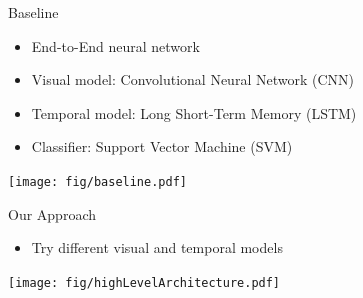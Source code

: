 \documentclass{beamer}
\begin{document}
\begin{frame}{Baseline}
    \begin{itemize}
        \item End-to-End neural network
        \item Visual model: Convolutional Neural Network (CNN)
        \item Temporal model: Long Short-Term Memory (LSTM)
        \item Classifier: Support Vector Machine (SVM)
    \end{itemize}
    \begin{center}
    \texttt{[image: fig/baseline.pdf]}   
    \end{center}
\end{frame}

\begin{frame}{Our Approach}
    \begin{itemize}
        \item Try different visual and temporal models
    \end{itemize}
    \begin{center}
    \texttt{[image: fig/highLevelArchitecture.pdf]}   
    \end{center}
\end{frame}
\end{document}
